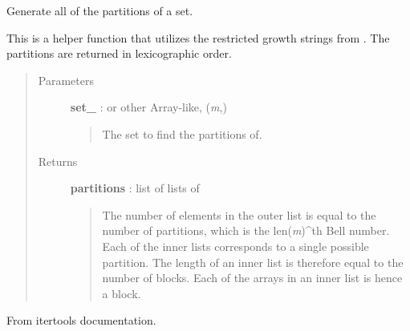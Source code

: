 \documentclass[letterpaper,10pt,english]{sphinxmanual}
\begin{document}
\begin{fulllineitems}
\label{gptools:gptools.utils.generate_set_partitions}
Generate all of the partitions of a set.

This is a helper function that utilizes the restricted growth strings from
{\hyperref[gptools:gptools.utils.generate_set_partition_strings]{}}. The partitions are returned in
lexicographic order.
\begin{quote}\begin{description}
\item[{Parameters}] \leavevmode
\textbf{set\_} :  or other Array-like, (\emph{m},)
\begin{quote}

The set to find the partitions of.
\end{quote}

\item[{Returns}] \leavevmode
\textbf{partitions} : list of lists of 
\begin{quote}

The number of elements in the outer list is equal to the number of
partitions, which is the len(\emph{m})\textasciicircum{}th Bell number. Each of the inner lists
corresponds to a single possible partition. The length of an inner list
is therefore equal to the number of blocks. Each of the arrays in an
inner list is hence a block.
\end{quote}

\end{description}\end{quote}

\end{fulllineitems}


\begin{fulllineitems}
\label{gptools:gptools.utils.powerset}
From itertools documentation.

\end{fulllineitems}

\end{document}
